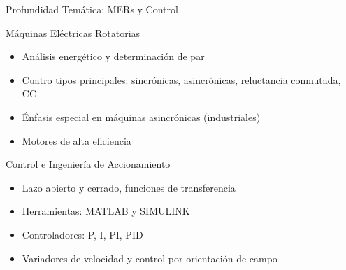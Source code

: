 \documentclass[aspectratio=43]{beamer}
\begin{document}
  \begin{frame}{Profundidad Temática: MERs y Control}
  \begin{block}{Máquinas Eléctricas Rotatorias}
  \begin{itemize}
  \item Análisis energético y determinación de par
  \item Cuatro tipos principales: sincrónicas, asincrónicas, reluctancia conmutada, CC
  \item Énfasis especial en máquinas asincrónicas (industriales)
  \item Motores de alta eficiencia
  \end{itemize}
  \end{block}
  
  \begin{block}{Control e Ingeniería de Accionamiento}
  \begin{itemize}
  \item Lazo abierto y cerrado, funciones de transferencia
  \item Herramientas: MATLAB y SIMULINK
  \item Controladores: P, I, PI, PID
  \item Variadores de velocidad y control por orientación de campo
  \end{itemize}
  \end{block}
  
  \end{frame}
  
\end{document}
